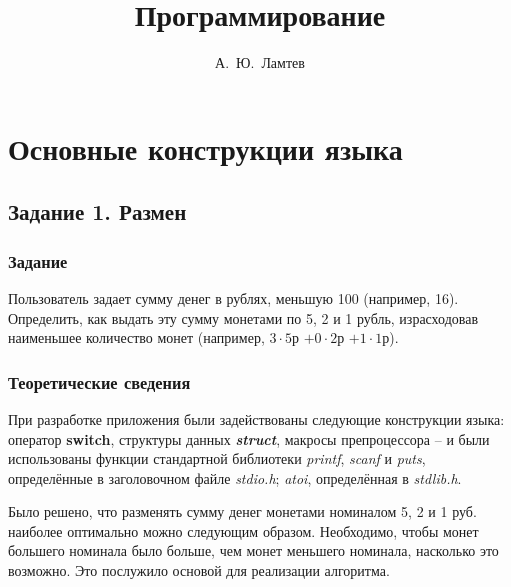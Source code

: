\documentclass[12pt,a4paper]{report}
\author{А.~Ю.~Ламтев}
\title{Программирование}
\begin{document}
\maketitle
\tableofcontents{}

\chapter{Основные конструкции языка}
\section{Задание 1. Размен}
\subsection{Задание}
\hspace{\parindent}
Пользователь задает сумму денег в рублях, меньшую 100 (например, 16). Определить, как выдать эту сумму монетами по 5, 2 и 1 рубль, израсходовав наименьшее количество монет (например, $3 \cdot 5$р $+ 0 \cdot 2$р $+ 1 \cdot 1$р).
\subsection{Теоретические сведения}

\hspace{\parindent}
При разработке приложения были задействованы следующие конструкции языка: оператор \textbf{switch}, структуры данных \textit{\textbf{struct}}, макросы препроцессора -- и были использованы функции стандартной библиотеки \textit{printf}, \textit{scanf} и \textit{puts}, определённые в заголовочном файле \textit{stdio.h}; \textit{atoi}, определённая в \textit{stdlib.h}. 

\hspace{\parindent}
Было решено, что разменять сумму денег монетами номиналом 5, 2 и 1 руб. наиболее оптимально можно следующим образом. Необходимо, чтобы монет большего номинала было больше, чем монет меньшего номинала, насколько это возможно. Это послужило основой для реализации алгоритма.
\end{document}
